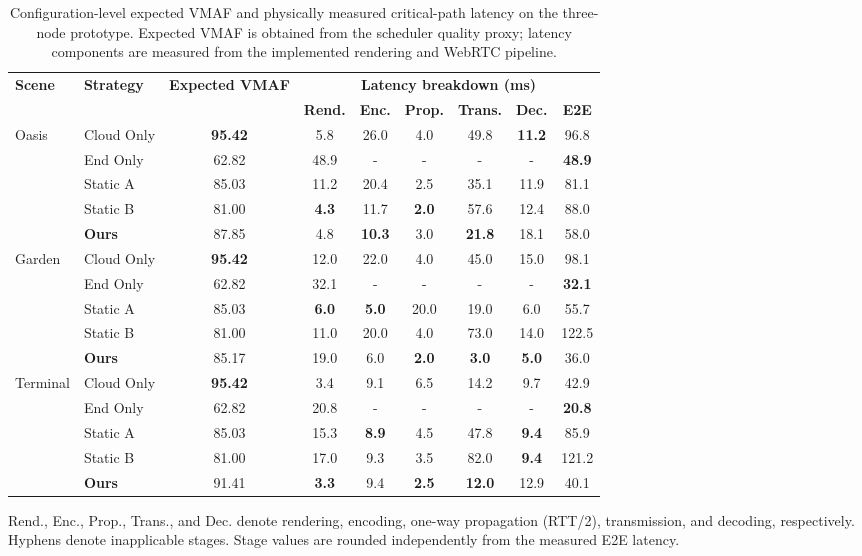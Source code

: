 \documentclass[acmsmall]{acmart}
\begin{document}
	\begin{table}[htbp]
		\centering
		\caption{Configuration-level expected VMAF and physically measured critical-path latency on the three-node prototype. Expected VMAF is obtained from the scheduler quality proxy; latency components are measured from the implemented rendering and WebRTC pipeline.}
		\label{tab:prototype_summary}
		\scriptsize
		\setlength{\tabcolsep}{2.3pt}
		\renewcommand{\arraystretch}{0.90}
		\begin{tabular*}{\linewidth}{@{\extracolsep{\fill}}llccccccc@{}}
			\toprule
			\multirow{2}{*}{\textbf{Scene}} & \multirow{2}{*}{\textbf{Strategy}} & \multirow{2}{*}{\textbf{Expected VMAF}} &
			\multicolumn{6}{c}{\textbf{Latency breakdown (ms)}} \\
			\cmidrule(lr){4-9}
			& & & \textbf{Rend.} & \textbf{Enc.} & \textbf{Prop.} &
			\textbf{Trans.} & \textbf{Dec.} & \textbf{E2E} \\
			\midrule
			\multirow{5}{*}{Oasis}
			& Cloud Only & \textbf{95.42} & 5.8 & 26.0 & 4.0 & 49.8 & \textbf{11.2} & 96.8 \\
			& End Only & 62.82 & 48.9 & - & - & - & - & \textbf{48.9} \\
			& Static A & 85.03 & 11.2 & 20.4 & 2.5 & 35.1 & 11.9 & 81.1 \\
			& Static B & 81.00 & \textbf{4.3} & 11.7 & \textbf{2.0} & 57.6 & 12.4 & 88.0 \\
			& \textbf{Ours} & 87.85 & 4.8 & \textbf{10.3} & 3.0 & \textbf{21.8} & 18.1 & 58.0 \\
			\midrule
			\multirow{5}{*}{Garden}
			& Cloud Only & \textbf{95.42} & 12.0 & 22.0 & 4.0 & 45.0 & 15.0 & 98.1 \\
			& End Only & 62.82 & 32.1 & - & - & - & - & \textbf{32.1} \\
			& Static A & 85.03 & \textbf{6.0} & \textbf{5.0} & 20.0 & 19.0 & 6.0 & 55.7 \\
			& Static B & 81.00 & 11.0 & 20.0 & 4.0 & 73.0 & 14.0 & 122.5 \\
			& \textbf{Ours} & 85.17 & 19.0 & 6.0 & \textbf{2.0} & \textbf{3.0} & \textbf{5.0} & 36.0 \\
			\midrule
			\multirow{5}{*}{Terminal}
			& Cloud Only & \textbf{95.42} & 3.4 & 9.1 & 6.5 & 14.2 & 9.7 & 42.9 \\
			& End Only & 62.82 & 20.8 & - & - & - & - & \textbf{20.8} \\
			& Static A & 85.03 & 15.3 & \textbf{8.9} & 4.5 & 47.8 & \textbf{9.4} & 85.9 \\
			& Static B & 81.00 & 17.0 & 9.3 & 3.5 & 82.0 & \textbf{9.4} & 121.2 \\
			& \textbf{Ours} & 91.41 & \textbf{3.3} & 9.4 & \textbf{2.5} & \textbf{12.0} & 12.9 & 40.1 \\
			\bottomrule
		\end{tabular*}
		\par\smallskip
		\raggedright\scriptsize Rend., Enc., Prop., Trans., and Dec. denote rendering,
		encoding, one-way propagation (RTT/2), transmission, and decoding, respectively.
		Hyphens denote inapplicable stages. Stage values are rounded independently from the
		measured E2E latency.\par
	\end{table}
	
\end{document}
